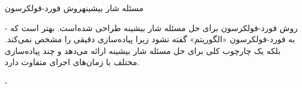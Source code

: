 \begin{itemframe}{مسئله شار بیشینه}{روش فورد-فولکرسون}
\item[-]
روش فورد-فولکرسون
برای حل مسئله شار بیشینه طراحی شده‌است. بهتر است که به فورد-فولکرسون «الگوریتم» گفته نشود زیرا پیاده‌سازی دقیقی را مشخص نمی‌کند. بلکه یک چارچوب کلی برای حل مسئله شار بیشینه ارائه می‌دهد و چند پیاده‌سازی مختلف با زمان‌های اجرای متفاوت دارد.
\item[-]
\end{itemframe}

